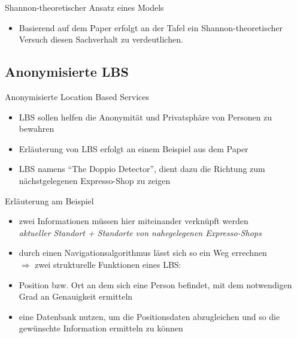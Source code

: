 \begin{frame}{Shannon-theoretischer Ansatz eines Models}
\begin{itemize}
  \item Basierend auf dem Paper erfolgt an der Tafel ein Shannon-theoretischer Versuch diesen Sachverhalt zu verdeutlichen.
\end{itemize}
\end{frame}

\subsection{Anonymisierte LBS}
\begin{frame}{Anonymisierte Location Based Services}
\begin{itemize}
  \item LBS sollen helfen die Anonymität und Privatsphäre von Personen zu bewahren
  \item Erläuterung von LBS erfolgt an einem Beispiel aus dem Paper
  \item LBS namens "`The Doppio Detector"', dient dazu die Richtung zum nächstgelegenen Expresso-Shop zu zeigen
\end{itemize}
\end{frame}

\begin{frame}{Erläuterung am Beispiel}
\begin{itemize}
  \item zwei Informationen müssen hier miteinander verknüpft werden\\ \vspace{.1cm}
  \textit{aktueller Standort + Standorte von nahegelegenen Expresso-Shops}
  \item durch einen Navigationsalgorithmus lässt sich so ein Weg errechnen\\ \vspace{0.5cm}
  \hspace{-0.5cm}$\Longrightarrow$ zwei strukturelle Funktionen eines LBS:\\ \vspace{0.2cm}
  \enumerate
    \item Position bzw. Ort an dem sich eine Person befindet, mit dem notwendigen Grad an Genauigkeit ermitteln
    \item eine Datenbank nutzen, um die Positionsdaten abzugleichen und so die gewünschte Information ermitteln zu können
  \endenumerate  
\end{itemize}
\end{frame}

